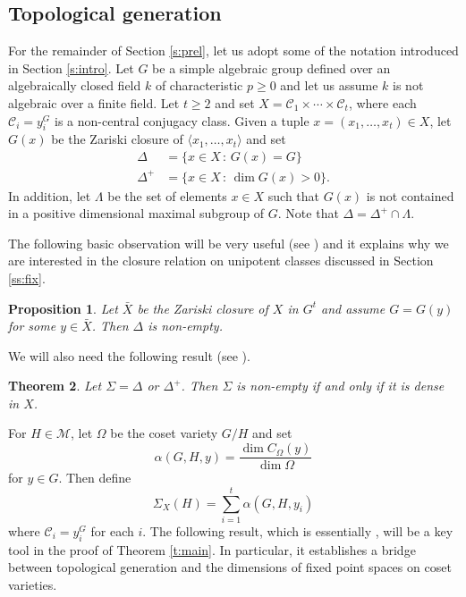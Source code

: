 \documentclass[twoside,a4paper,reqno,11pt]{amsart}
\renewcommand{\a}{\alpha}
\renewcommand{\O}{\Omega}
\newcommand{\<}{\langle}
\renewcommand{\>}{\rangle}
\newcommand{\la}{\langle}
\newcommand{\ra}{\rangle}
\newcommand{\geqs}{\geqslant}
\renewcommand{\:}{\colon}
\theoremstyle{plain}
\newtheorem{thm}{Theorem}[section]
\newtheorem{prop}[thm]{Proposition}
\theoremstyle{definition}
\begin{document}
\subsection{Topological generation}\label{ss:top}

For the remainder of Section \ref{s:prel}, let us adopt some of the notation introduced in Section \ref{s:intro}. Let $G$ be a simple algebraic group defined over an algebraically closed field $k$ of characteristic $p \geqs 0$ and let us assume $k$ is not algebraic over a finite field. Let $t \geqs 2$ and set $X = \mathcal{C}_1 \times \cdots \times \mathcal{C}_t$, where each $\mathcal{C}_i = y_i^G$ is a non-central conjugacy class. Given a tuple $x = (x_1, \ldots, x_t) \in X$, let $G(x)$ be the Zariski closure of $\la x_1, \ldots, x_t \ra$ and set
\begin{align*}
\Delta & = \{x \in X \,:\, G(x) = G\} \\
\Delta^{+} & = \{x \in X \,:\, \dim G(x) > 0\}. 
\end{align*}
In addition, let $\Lambda$ be the set of elements $x \in X$ such that $G(x)$ is not contained in a positive dimensional maximal subgroup of $G$. Note that $\Delta = \Delta^+ \cap \Lambda$. 

The following basic observation will be very useful (see \cite[Lemma 2.2]{BGG2}) and it explains why we are interested in the closure relation on unipotent classes discussed in Section \ref{ss:fix}.

\begin{prop}\label{p:clos}
Let $\bar{X}$ be the Zariski closure of $X$ in $G^t$ and assume $G = G(y)$ for some $y \in \bar{X}$. Then $\Delta$ is non-empty.
\end{prop}

We will also need the following result (see \cite[Theorems 1 and 2]{BGG1}). 

\begin{thm}\label{t:plus}
Let $\Sigma = \Delta$ or $\Delta^+$. Then $\Sigma$ is non-empty if and only if it is dense in $X$.
\end{thm}

For $H \in \mathcal{M}$, let $\O$ be the coset variety $G/H$ and set 
\begin{equation}\label{e:alpha}
\a(G,H,y) = \frac{\dim C_{\O}(y)}{\dim \O}
\end{equation}
for $y \in G$. Then define 
\begin{equation}\label{e:sig}
\Sigma_X(H) = \sum_{i=1}^t \a(G,H,y_i)
\end{equation}
where $\mathcal{C}_i = y_i^G$ for each $i$. The following result, which is essentially \cite[Theorem 5]{BGG1}, will be a key tool in the proof of Theorem \ref{t:main}. In particular, it establishes a bridge between topological generation and the dimensions of fixed point spaces on coset varieties.
\end{document}
